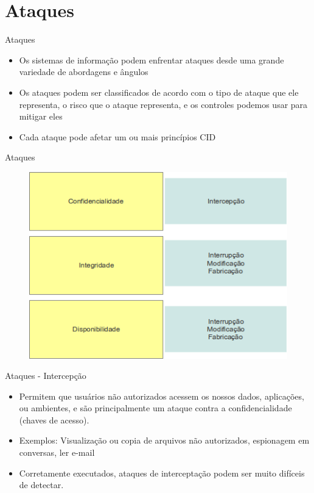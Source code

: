 \documentclass{beamer}
\begin{document}
\section{Ataques}
\begin{frame}{Ataques}
\begin{itemize}
\item Os sistemas de informação podem enfrentar ataques desde uma grande variedade de abordagens e ângulos
\item Os ataques podem ser classificados de acordo com o tipo de ataque que ele representa, o risco que o ataque representa, e os controles podemos usar para mitigar eles
\item Cada ataque pode afetar um ou mais princípios CID
\end{itemize}
\end{frame}


\begin{frame}{Ataques}
\begin{figure}[tbph]
\centering
\includegraphics[width=0.70\linewidth]{./atacks.png}
\label{fig:atacks}
\end{figure}
\end{frame}

\begin{frame}{Ataques - Intercepção}
\begin{itemize}
\item Permitem que usuários não autorizados acessem os nossos dados, aplicações, ou ambientes, e são principalmente um ataque contra a confidencialidade (chaves de acesso).
\item Exemplos: Visualização ou copia de arquivos não autorizados, espionagem em conversas, ler e-mail
\item Corretamente executados, ataques de interceptação podem ser muito difíceis de detectar.
\end{itemize}
\end{frame}
\end{document}
